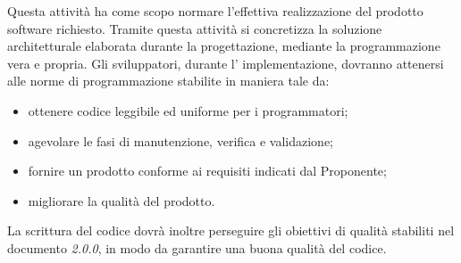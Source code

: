     Questa attività ha come scopo normare l'effettiva realizzazione del prodotto software richiesto. Tramite questa attività si concretizza la soluzione architetturale elaborata durante la progettazione, mediante la programmazione vera e propria.
    Gli sviluppatori, durante l' implementazione, dovranno attenersi alle norme di programmazione stabilite in maniera tale da:
    \begin{itemize}
       	\item ottenere codice leggibile ed uniforme per i programmatori;
       	\item agevolare le fasi di manutenzione, verifica e validazione;
       	\item fornire un prodotto conforme ai requisiti indicati dal Proponente;
       	\item migliorare la qualità del prodotto.
   	\end{itemize}

   	\noindent La scrittura del codice dovrà inoltre perseguire gli obiettivi di qualità stabiliti nel documento \textit{\PdQ{} 2.0.0}, in modo da garantire una buona qualità del codice.

